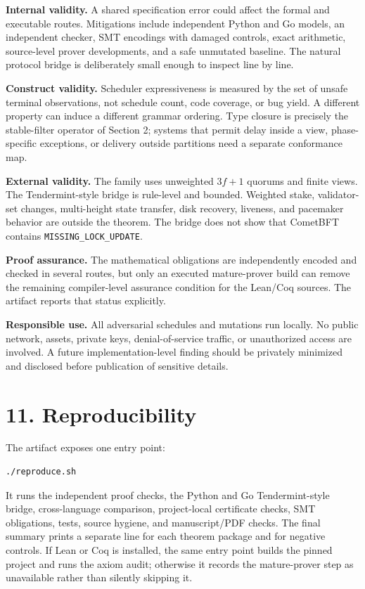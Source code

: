 \documentclass[10pt,a4paper]{article}
\begin{document}
\textbf{Internal validity.} A shared specification error could affect
the formal and executable routes. Mitigations include independent Python
and Go models, an independent checker, SMT encodings with damaged
controls, exact arithmetic, source-level prover developments, and a safe
unmutated baseline. The natural protocol bridge is deliberately small
enough to inspect line by line.

\textbf{Construct validity.} Scheduler expressiveness is measured by the
set of unsafe terminal observations, not schedule count, code coverage,
or bug yield. A different property can induce a different grammar
ordering. Type closure is precisely the stable-filter operator of
Section 2; systems that permit delay inside a view, phase-specific
exceptions, or delivery outside partitions need a separate conformance
map.

\textbf{External validity.} The family uses unweighted \(3f+1\) quorums
and finite views. The Tendermint-style bridge is rule-level and bounded.
Weighted stake, validator-set changes, multi-height state transfer, disk
recovery, liveness, and pacemaker behavior are outside the theorem. The
bridge does not show that CometBFT contains
\texttt{MISSING\_LOCK\_UPDATE}.

\textbf{Proof assurance.} The mathematical obligations are independently
encoded and checked in several routes, but only an executed
mature-prover build can remove the remaining compiler-level assurance
condition for the Lean/Coq sources. The artifact reports that status
explicitly.

\textbf{Responsible use.} All adversarial schedules and mutations run
locally. No public network, assets, private keys, denial-of-service
traffic, or unauthorized access are involved. A future
implementation-level finding should be privately minimized and disclosed
before publication of sensitive details.

\section{11. Reproducibility}\label{reproducibility}

The artifact exposes one entry point:

\begin{verbatim}
./reproduce.sh
\end{verbatim}

It runs the independent proof checks, the Python and Go Tendermint-style
bridge, cross-language comparison, project-local certificate checks, SMT
obligations, tests, source hygiene, and manuscript/PDF checks. The final
summary prints a separate line for each theorem package and for negative
controls. If Lean or Coq is installed, the same entry point builds the
pinned project and runs the axiom audit; otherwise it records the
mature-prover step as unavailable rather than silently skipping it.
\end{document}

